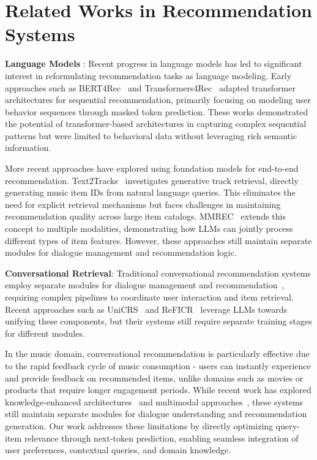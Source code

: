 \section{Related Works in Recommendation Systems}
\textbf{Language Models
}: 
Recent progress in language models has led to significant interest in reformulating recommendation tasks as language modeling. Early approaches such as BERT4Rec~\cite{bert4rec} and Transformers4Rec~\cite{transformers4rec} adapted transformer architectures for sequential recommendation, primarily focusing on modeling user behavior sequences through masked token prediction. These works demonstrated the potential of transformer-based architectures in capturing complex sequential patterns but were limited to behavioral data without leveraging rich semantic information.

More recent approaches have explored using foundation models for end-to-end recommendation. Text2Tracks~\cite{text2tracks} investigates generative track retrieval, directly generating music item IDs from natural language queries. This eliminates the need for explicit retrieval mechanisms but faces challenges in maintaining recommendation quality across large item catalogs. MMREC~\cite{mmrec} extends this concept to multiple modalities, demonstrating how LLMs can jointly process different types of item features. However, these approaches still maintain separate modules for dialogue management and recommendation logic.


\textbf{Conversational Retrieval}:
Traditional conversational recommendation systems employ separate modules for dialogue management and recommendation~\cite{zhang2018towards, chen2019towards}, requiring complex pipelines to coordinate user interaction and item retrieval. Recent approaches such as UniCRS~\cite{unicrs} and ReFICR~\cite{reficr} leverage LLMs towards unifying these components, but their systems still require separate training stages for different modules.

In the music domain, conversational recommendation is particularly effective due to the rapid feedback cycle of music consumption - users can instantly experience and provide feedback on recommended items, unlike domains such as movies or products that require longer engagement periods. While recent work has explored knowledge-enhanced architectures~\cite{zhang2021kecrs} and multimodal approaches~\cite{liu2023m3ke}, these systems still maintain separate modules for dialogue understanding and recommendation generation. Our work addresses these limitations by directly optimizing query-item relevance through next-token prediction, enabling seamless integration of user preferences, contextual queries, and domain knowledge.

